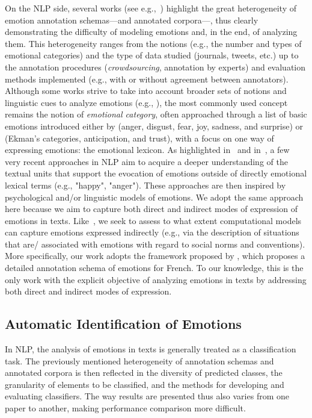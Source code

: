 On the NLP side, several works (see e.g.,~\citealp{bostan_analysis_2018,acheampong_text-based_2020,ohman_emotion_2020}) highlight the great heterogeneity of emotion annotation schemas---and annotated corpora---, thus clearly demonstrating the difficulty of modeling emotions and, in the end, of analyzing them. This heterogeneity ranges from the notions (e.g., the number and types of emotional categories) and the type of data studied (journals, tweets, etc.) up to the annotation procedures (\textit{crowdsourcing}, annotation by experts) and evaluation methods implemented (e.g., with or without agreement between annotators). Although some works strive to take into account broader sets of notions and linguistic cues to analyze emotions (e.g., \citealp{casel-etal-2021-emotion, kim_analysis_2019}), the most commonly used concept remains the notion of \textit{emotional category}, often approached through a list of basic emotions introduced either by \citet{ekman_argument_1992} (anger, disgust, fear, joy, sadness, and surprise) or \citet{plutchik_general_1980} (Ekman's categories, anticipation, and trust), with a focus on one way of expressing emotions: the emotional lexicon.
As highlighted in~\citep{klinger2023eventcentric} and in~\citep{Troiano_klinger_2023}, a few very recent approaches in NLP aim to acquire a deeper understanding of the textual units that support the evocation of emotions outside of directly emotional lexical terms (e.g., "happy", "anger"). These approaches are then inspired by psychological and/or linguistic models of emotions. We adopt the same approach here because we aim to capture both direct and indirect modes of expression of emotions in texts. Like~\citet{Troiano_klinger_2023}, we seek to assess to what extent computational models can capture emotions expressed indirectly (e.g., via the description of situations that are/ associated with emotions with regard to social norms and conventions). More specifically, our work adopts the framework proposed by \citet{etienne_psycho-linguistically_2022}, which proposes a detailed annotation schema of emotions for French.
%
To our knowledge, this is the only work with the explicit objective of analyzing emotions in texts by addressing both direct and indirect modes of expression.

\subsection{Automatic Identification of Emotions}
\label{subsec:systems}
In NLP, the analysis of emotions in texts is generally treated as a classification task. The previously mentioned heterogeneity of annotation schemas and annotated corpora is then reflected in the diversity of predicted classes, the granularity of elements to be classified, and the methods for developing and evaluating classifiers. The way results are presented thus also varies from one paper to another, making performance comparison more difficult.

